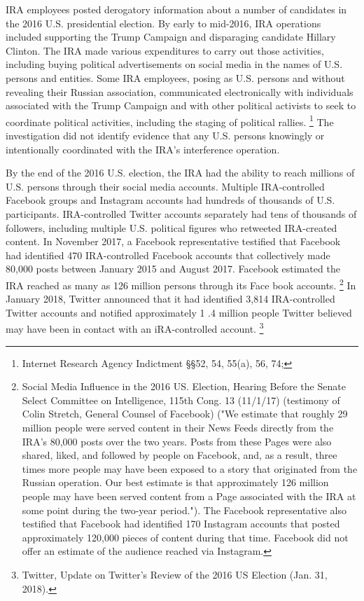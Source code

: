 IRA employees posted derogatory information about a  number of candidates in the 2016 U.S. presidential election.
By early to mid-2016, IRA operations included supporting the Trump Campaign and disparaging candidate Hillary Clinton.
The IRA made various expenditures to carry out those activities, including buying political advertisements on social media in the names of U.S. persons and entities.
Some IRA employees, posing as U.S. persons and without revealing their Russian association, communicated electronically with individuals associated with the Trump Campaign and with other political activists to seek to coordinate political activities, including the staging of political rallies.%
\footnote{Internet Research Agency Indictment \S\S 52, 54, 55(a), 56, 74; }
The investigation did not identify evidence that any U.S. persons knowingly or intentionally coordinated with the IRA's interference operation.

By the end of the 2016 U.S. election, the IRA had the ability to reach millions of U.S. persons through their social media accounts.
Multiple IRA-controlled Facebook groups and Instagram accounts had hundreds of thousands of U.S. participants.
IRA-controlled Twitter accounts separately had tens of thousands of followers, including multiple U.S. political figures who retweeted IRA-created content.
In November 2017, a Facebook representative testified that Facebook had identified 470 IRA-controlled Facebook accounts that collectively made 80,000 posts between January 2015 and August 2017.
Facebook estimated the IRA reached as many as 126 million persons through its Face book accounts.%
\footnote{Social Media Influence in the 2016 US. Election, Hearing Before the Senate Select Committee on Intelligence, 115th Cong. 13 (11/1/17) (testimony of Colin Stretch, General Counsel of Facebook)
("We estimate that roughly 29 million people were served content in their News Feeds directly from the IRA's 80,000 posts over the two years.
Posts from these Pages were also shared, liked, and followed by people on Facebook, and, as a result, three times more people may have been exposed to a story that originated from the Russian operation.
Our best estimate is that approximately 126 million people may have been served content from a Page associated with the IRA at some point during the two-year period.").
The Facebook representative also testified that Facebook had identified 170 Instagram accounts that posted approximately 120,000 pieces of content during that time.
Facebook did not offer an estimate of the audience reached via Instagram.}
In January 2018, Twitter announced that it had identified 3,814 IRA-controlled Twitter accounts and notified approximately 1 .4 million people Twitter believed may have been in contact with an iRA-controlled account.%
\footnote{Twitter, Update on Twitter's Review of the 2016 US Election (Jan. 31, 2018).}

